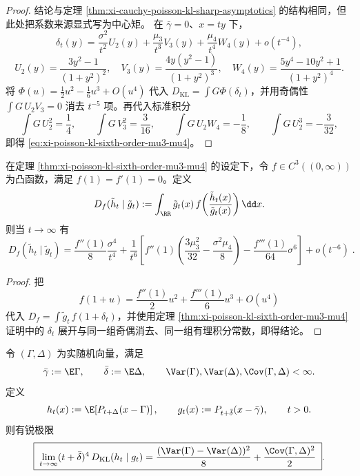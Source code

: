 \begin{proof}
结论与定理 \ref{thm:xi-cauchy-poisson-kl-sharp-asymptotics} 的结构相同，但此处把系数来源显式写为中心矩。
在 \(\bar\gamma=0\)、\(x=ty\) 下，
\[
\delta_t(y)
=\frac{\sigma^2}{t^2}U_2(y)
+\frac{\mu_3}{t^3}V_3(y)
+\frac{\mu_4}{t^4}W_4(y)
+o(t^{-4}),
\]
\[
U_2(y)=\frac{3y^2-1}{(1+y^2)^2},\quad
V_3(y)=\frac{4y(y^2-1)}{(1+y^2)^3},\quad
W_4(y)=\frac{5y^4-10y^2+1}{(1+y^2)^4}.
\]
将
\(
\Phi(u)=\frac12u^2-\frac16u^3+O(u^4)
\)
代入 \(D_{\mathrm{KL}}=\int G\Phi(\delta_t)\)，并用奇偶性
\(\int G\,U_2V_3=0\) 消去 \(t^{-5}\) 项。再代入标准积分
\[
\int G\,U_2^2=\frac14,\qquad
\int G\,V_3^2=\frac{3}{16},\qquad
\int G\,U_2W_4=-\frac18,\qquad
\int G\,U_2^3=-\frac{3}{32},
\]
即得 \eqref{eq:xi-poisson-kl-sixth-order-mu3-mu4}。
\end{proof}

\begin{proposition}\label{prop:xi-poisson-fdiv-sixth-order-mu3-mu4}
在定理 \ref{thm:xi-poisson-kl-sixth-order-mu3-mu4} 的设定下，令 \(f\in C^3((0,\infty))\) 为凸函数，满足 \(f(1)=f'(1)=0\)。定义
\[
D_f(\tilde h_t\mid \tilde g_t):=
\int_{\RR}\tilde g_t(x)\,
f\!\left(\frac{\tilde h_t(x)}{\tilde g_t(x)}\right)\dd x.
\]
则当 \(t\to\infty\) 有
\begin{equation}\label{eq:xi-poisson-fdiv-sixth-order}
\boxed{\;
D_f(\tilde h_t\mid \tilde g_t)
=\frac{f''(1)}{8}\frac{\sigma^4}{t^4}
+\frac{1}{t^6}\left[
f''(1)\!\left(\frac{3\mu_3^2}{32}-\frac{\sigma^2\mu_4}{8}\right)
-\frac{f'''(1)}{64}\sigma^6
\right]
+o(t^{-6})\; }.
\end{equation}
\end{proposition}

\begin{proof}
把
\[
f(1+u)=\frac{f''(1)}{2}u^2+\frac{f'''(1)}{6}u^3+O(u^4)
\]
代入 \(D_f=\int \tilde g_t\,f(1+\delta_t)\)，并使用定理 \ref{thm:xi-poisson-kl-sixth-order-mu3-mu4} 证明中的
\(\delta_t\) 展开与同一组奇偶消去、同一组有理积分常数，即得结论。
\end{proof}

\begin{theorem}\label{thm:xi-poisson-two-parameter-kl-sharp-quadratic}
令 \((\Gamma,\Delta)\) 为实随机向量，满足
\[
\bar\gamma:=\E\Gamma,\qquad
\bar\delta:=\E\Delta,\qquad
\Var(\Gamma),\Var(\Delta),\Cov(\Gamma,\Delta)<\infty.
\]
定义
\[
h_t(x):=\E\!\left[P_{t+\Delta}(x-\Gamma)\right],\qquad
g_t(x):=P_{t+\bar\delta}(x-\bar\gamma),\qquad t>0.
\]
则有锐极限
\begin{equation}\label{eq:xi-poisson-two-parameter-kl-sharp-quadratic}
\boxed{\;
\lim_{t\to\infty}(t+\bar\delta)^4\,D_{\mathrm{KL}}(h_t\mid g_t)
=\frac{(\Var(\Gamma)-\Var(\Delta))^2}{8}
+\frac{\Cov(\Gamma,\Delta)^2}{2}\; }.
\end{equation}
\end{theorem}


